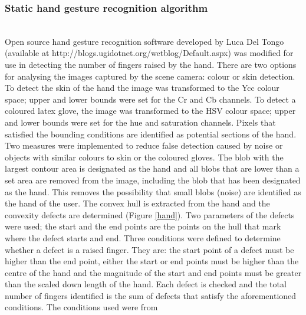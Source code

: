 \documentclass[jou,a4paper,notxfonts]{apa}
\begin{document}
\subsubsection{Static hand gesture recognition algorithm}\hspace{0pt} \\
Open source hand gesture recognition software developed by Luca Del Tongo (available at http://blogs.ugidotnet.org/wetblog/Default.aspx) was modified for use in detecting the number of fingers raised by the hand. There are two options for analysing the images captured by the scene camera: colour or skin detection. To detect the skin of the hand the image was transformed to the Ycc colour space; upper and lower bounds were set for the Cr and Cb channels. To detect a coloured latex glove, the image was transformed to the HSV colour space; upper and lower bounds were set for the hue and saturation channels. Pixels that satisfied the bounding conditions are identified as potential sections of the hand. Two measures were implemented to reduce false detection caused by noise or objects with similar colours to skin or the coloured gloves. The blob with the largest contour area is designated as the hand and all blobs that are lower than a set area are removed from the image, including the blob that has been designated as the hand. This removes the possibility that small blobs (noise) are identified as the hand of the user. The convex hull is extracted from the hand and the convexity defects are determined (Figure \ref{hand}). Two parameters of the defects were used; the start and the end points are the points on the hull that mark where the defect starts and end. Three conditions were defined to determine whether a defect is a raised finger. They are: the start point of a defect must be higher than the end point, either the start or end points must be higher than the centre of the hand and the magnitude of the start and end points must be greater than the scaled down length of the hand. Each defect is checked and the total number of fingers identified is the sum of defects that satisfy the aforementioned conditions. The conditions used were from 
\end{document}

